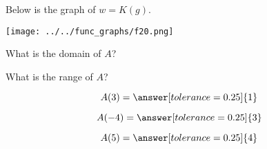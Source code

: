 \documentclass{ximera}
\author{Lee Wayand}
\begin{document}
\begin{exercise}  





Below is the graph of $w=K(g)$.  

\begin{image}
\texttt{[image: ../../func\_graphs/f20.png]}
\end{image}









\begin{question} 


What is the domain of $A$?\\


\begin{multipleChoice}
\choice [correct]{$(-\infty, -7) \cup [-4, \infty)$}
\choice {$(-\infty, -7) \cup [-4, 3) \cup (3, \infty)$}
\choice {$(-\infty, \infty)$}
\end{multipleChoice}

\end{question}






\begin{question} 


What is the range of $A$?\\


\begin{multipleChoice}
\choice [correct]{$(-\infty, \infty)$}
\choice {$[-6, 7.5]$}
\end{multipleChoice}


\end{question}









\begin{question} 



\[  A(3) = \answer[tolerance=0.25]{1}  \]


\[  A(-4) = \answer[tolerance=0.25]{3}  \]


\[  A(5) = \answer[tolerance=0.25]{4}  \]

\end{question}











\end{exercise}
\end{document}
